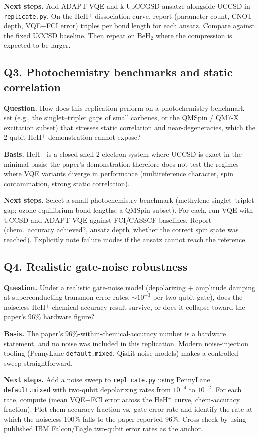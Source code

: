 \textbf{Next steps.} Add ADAPT-VQE and k-UpCCGSD ansatze alongside UCCSD in \verb|replicate.py|. On the HeH$^+$ dissociation curve, report (parameter count, CNOT depth, VQE$-$FCI error) triples per bond length for each ansatz. Compare against the fixed UCCSD baseline. Then repeat on BeH$_2$ where the compression is expected to be larger.

\subsection*{Q3. Photochemistry benchmarks and static correlation}
\textbf{Question.} How does this replication perform on a photochemistry benchmark set (e.g., the singlet--triplet gaps of small carbenes, or the QMSpin / QM7-X excitation subset) that stresses static correlation and near-degeneracies, which the 2-qubit HeH$^+$ demonstration cannot expose?

\textbf{Basis.} HeH$^+$ is a closed-shell 2-electron system where UCCSD is exact in the minimal basis; the paper's demonstration therefore does not test the regimes where VQE variants diverge in performance (multireference character, spin contamination, strong static correlation).

\textbf{Next steps.} Select a small photochemistry benchmark (methylene singlet--triplet gap; ozone equilibrium bond lengths; a QMSpin subset). For each, run VQE with UCCSD and ADAPT-VQE against FCI/CASSCF baselines. Report (chem.\ accuracy achieved?, ansatz depth, whether the correct spin state was reached). Explicitly note failure modes if the ansatz cannot reach the reference.

\subsection*{Q4. Realistic gate-noise robustness}
\textbf{Question.} Under a realistic gate-noise model (depolarizing + amplitude damping at superconducting-transmon error rates, $\sim 10^{-3}$ per two-qubit gate), does the noiseless HeH$^+$ chemical-accuracy result survive, or does it collapse toward the paper's 96\% hardware figure?

\textbf{Basis.} The paper's 96\%-within-chemical-accuracy number is a hardware statement, and no noise was included in this replication. Modern noise-injection tooling (PennyLane \verb|default.mixed|, Qiskit noise models) makes a controlled sweep straightforward.

\textbf{Next steps.} Add a noise sweep to \verb|replicate.py| using PennyLane \verb|default.mixed| with two-qubit depolarizing rates from $10^{-4}$ to $10^{-2}$. For each rate, compute (mean VQE$-$FCI error across the HeH$^+$ curve, chem-accuracy fraction). Plot chem-accuracy fraction vs.\ gate error rate and identify the rate at which the noiseless 100\% falls to the paper-reported 96\%. Cross-check by using published IBM Falcon/Eagle two-qubit error rates as the anchor.

